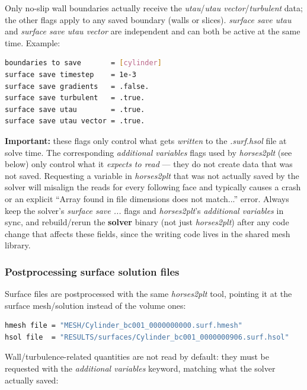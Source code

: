 \documentclass[a4paper,10pt]{report}
\begin{document}
Only no-slip wall boundaries actually receive the \textit{utau}/\textit{utau vector}/\textit{turbulent} data; the other flags apply to any saved boundary (walls or slices). \textit{surface save utau} and \textit{surface save utau vector} are independent and can both be active at the same time. Example:

\begin{lstlisting}[language=bash]
boundaries to save       = [cylinder]
surface save timestep    = 1e-3
surface save gradients   = .false.
surface save turbulent   = .true.
surface save utau        = .true.
surface save utau vector = .true.
\end{lstlisting}

\textbf{Important:} these flags only control what gets \textit{written} to the \textit{.surf.hsol} file at solve time. The corresponding \textit{additional variables} flags used by \textit{horses2plt} (see below) only control what it \textit{expects to read} --- they do not create data that was not saved. Requesting a variable in \textit{horses2plt} that was not actually saved by the solver will misalign the reads for every following face and typically causes a crash or an explicit ``Array found in file dimensions does not match...'' error. Always keep the solver's \textit{surface save ...} flags and \textit{horses2plt}'s \textit{additional variables} in sync, and rebuild/rerun the \textbf{solver} binary (not just \textit{horses2plt}) after any code change that affects these fields, since the writing code lives in the shared mesh library.

\subsubsection{Postprocessing surface solution files}

Surface files are postprocessed with the same \textit{horses2plt} tool, pointing it at the surface mesh/solution instead of the volume ones:

\begin{lstlisting}[language=bash]
hmesh file = "MESH/Cylinder_bc001_0000000000.surf.hmesh"
hsol file  = "RESULTS/surfaces/Cylinder_bc001_0000000906.surf.hsol"
\end{lstlisting}

Wall/turbulence-related quantities are not read by default: they must be requested with the \textit{additional variables} keyword, matching what the solver actually saved:
\end{document}
